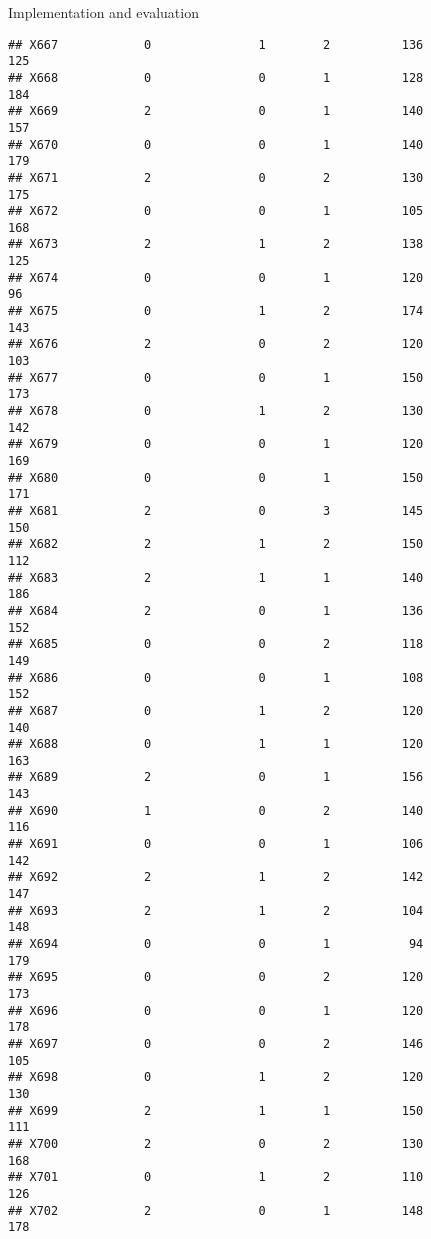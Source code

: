 \documentclass[
  ignorenonframetext,
]{beamer}
\begin{document}
\begin{frame}[fragile]{Implementation and evaluation}
\begin{verbatim}
## X667            0               1        2          136            125
## X668            0               0        1          128            184
## X669            2               0        1          140            157
## X670            0               0        1          140            179
## X671            2               0        2          130            175
## X672            0               0        1          105            168
## X673            2               1        2          138            125
## X674            0               0        1          120             96
## X675            0               1        2          174            143
## X676            2               0        2          120            103
## X677            0               0        1          150            173
## X678            0               1        2          130            142
## X679            0               0        1          120            169
## X680            0               0        1          150            171
## X681            2               0        3          145            150
## X682            2               1        2          150            112
## X683            2               1        1          140            186
## X684            2               0        1          136            152
## X685            0               0        2          118            149
## X686            0               0        1          108            152
## X687            0               1        2          120            140
## X688            0               1        1          120            163
## X689            2               0        1          156            143
## X690            1               0        2          140            116
## X691            0               0        1          106            142
## X692            2               1        2          142            147
## X693            2               1        2          104            148
## X694            0               0        1           94            179
## X695            0               0        2          120            173
## X696            0               0        1          120            178
## X697            0               0        2          146            105
## X698            0               1        2          120            130
## X699            2               1        1          150            111
## X700            2               0        2          130            168
## X701            0               1        2          110            126
## X702            2               0        1          148            178

\end{verbatim}
\end{frame}
\end{document}
